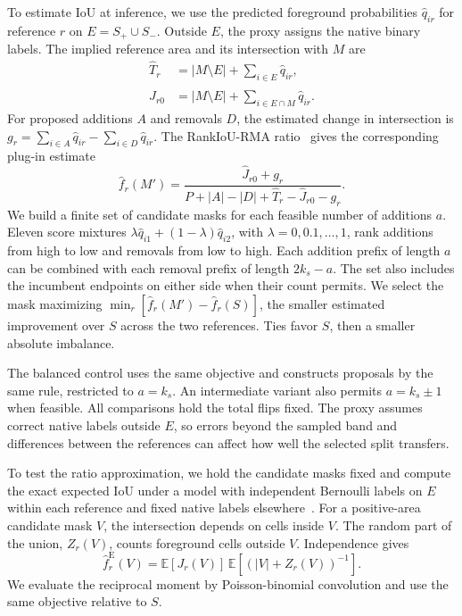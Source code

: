 \documentclass[journal]{IEEEtran}
\begin{document}
To estimate IoU at inference, we use the predicted foreground probabilities \(\widehat q_{ir}\) for reference \(r\) on \(E=S_+\cup S_-\). Outside \(E\), the proxy assigns the native binary labels. The implied reference area and its intersection with \(M\) are
\begin{equation}
 \begin{aligned}
  \widehat T_r &= |M\setminus E|+\sum_{i\in E}\widehat q_{ir},\\
  \widehat J_{r0} &= |M\setminus E|+\sum_{i\in E\cap M}\widehat q_{ir}.
 \end{aligned}
 \label{eq:dual-area-proxy}
\end{equation}
For proposed additions \(A\) and removals \(D\), the estimated change in intersection is \(g_r=\sum_{i\in A}\widehat q_{ir}-\sum_{i\in D}\widehat q_{ir}\). The RankIoU-RMA ratio~\cite{rankrma} gives the corresponding plug-in estimate
\begin{equation}
 \widehat f_r(M')=
 \frac{\widehat J_{r0}+g_r}
 {P+|A|-|D|+\widehat T_r-\widehat J_{r0}-g_r} .
 \label{eq:dual-est-iou}
\end{equation}
We build a finite set of candidate masks for each feasible number of additions \(a\). Eleven score mixtures \(\lambda\widehat q_{i1}+(1-\lambda)\widehat q_{i2}\), with \(\lambda=0,0.1,\ldots,1\), rank additions from high to low and removals from low to high. Each addition prefix of length \(a\) can be combined with each removal prefix of length \(2k_s-a\). The set also includes the incumbent endpoints on either side when their count permits. We select the mask maximizing \(\min_r[\widehat f_r(M')-\widehat f_r(S)]\), the smaller estimated improvement over \(S\) across the two references. Ties favor \(S\), then a smaller absolute imbalance.

The balanced control uses the same objective and constructs proposals by the same rule, restricted to \(a=k_s\). An intermediate variant also permits \(a=k_s\pm1\) when feasible. All comparisons hold the total flips fixed. The proxy assumes correct native labels outside \(E\), so errors beyond the sampled band and differences between the references can affect how well the selected split transfers.

To test the ratio approximation, we hold the candidate masks fixed and compute the exact expected IoU under a model with independent Bernoulli labels on \(E\) within each reference and fixed native labels elsewhere~\cite{rankseg}. For a positive-area candidate mask \(V\), the intersection depends on cells inside \(V\). The random part of the union, \(Z_r(V)\), counts foreground cells outside \(V\). Independence gives
\begin{equation}
 \widehat f_r^{\mathrm E}(V)
 =\mathbb{E}[J_r(V)]\,
  \mathbb{E}[(|V|+Z_r(V))^{-1}] .
 \label{eq:exact-iou-signed}
\end{equation}
We evaluate the reciprocal moment by Poisson-binomial convolution and use the same objective relative to \(S\).
\end{document}
